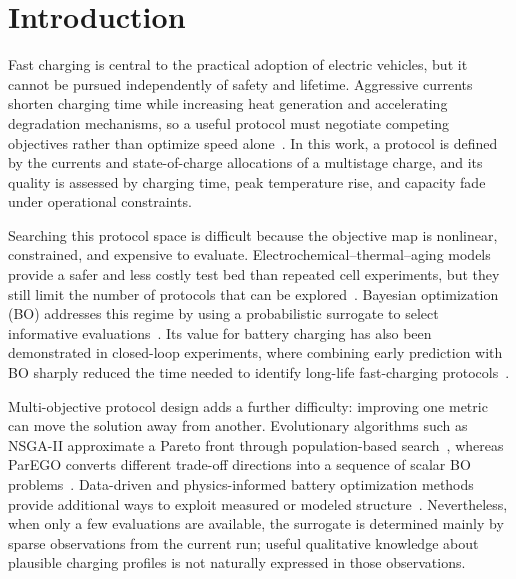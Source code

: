 \documentclass[journal]{IEEEtran}
\begin{document}
\IEEEpeerreviewmaketitle

\section{Introduction}
\label{sec:introduction}

Fast charging is central to the practical adoption of electric vehicles, but it cannot be pursued independently of safety and lifetime. Aggressive currents shorten charging time while increasing heat generation and accelerating degradation mechanisms, so a useful protocol must negotiate competing objectives rather than optimize speed alone~\cite{ref1,ref2}. In this work, a protocol is defined by the currents and state-of-charge allocations of a multistage charge, and its quality is assessed by charging time, peak temperature rise, and capacity fade under operational constraints.

Searching this protocol space is difficult because the objective map is nonlinear, constrained, and expensive to evaluate. Electrochemical--thermal--aging models provide a safer and less costly test bed than repeated cell experiments, but they still limit the number of protocols that can be explored~\cite{ref3}. Bayesian optimization (BO) addresses this regime by using a probabilistic surrogate to select informative evaluations~\cite{ref4}. Its value for battery charging has also been demonstrated in closed-loop experiments, where combining early prediction with BO sharply reduced the time needed to identify long-life fast-charging protocols~\cite{ref15}.

Multi-objective protocol design adds a further difficulty: improving one metric can move the solution away from another. Evolutionary algorithms such as NSGA-II approximate a Pareto front through population-based search~\cite{ref6}, whereas ParEGO converts different trade-off directions into a sequence of scalar BO problems~\cite{ref5}. Data-driven and physics-informed battery optimization methods provide additional ways to exploit measured or modeled structure~\cite{ref7,ref8}. Nevertheless, when only a few evaluations are available, the surrogate is determined mainly by sparse observations from the current run; useful qualitative knowledge about plausible charging profiles is not naturally expressed in those observations.
\end{document}
